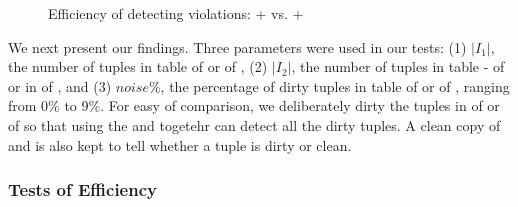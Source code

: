 \begin{figure}[tb!]
  \quad
  \quad
  \caption{Efficiency of detecting violations: \pCFDs + \pCINDs vs. \CFDs + \CINDs}\label{fig_exp1_both}
  \vspace{-3ex}
\end{figure}

We next present our findings.
%
Three parameters were used in our tests:
(1) $|I_1|$, the number of tuples in table  of \hosp or  of \dblp,
(2) $|I_2|$, the number of tuples in table - of \hosp or in  of \dblp, and
(3) $noise\%$, the percentage of dirty tuples in table  of \hosp or   of \dblp, ranging from 0\% to 9\%.
For easy of comparison, we deliberately dirty the tuples in  of \hosp or   of \dblp so that using the \pCFDs and \pCINDs togetehr can detect all the dirty tuples. A clean copy of \hosp and \dblp is also kept to tell whether a tuple is dirty or clean.


\vspace{-1ex}
\subsubsection{Tests of Efficiency}



